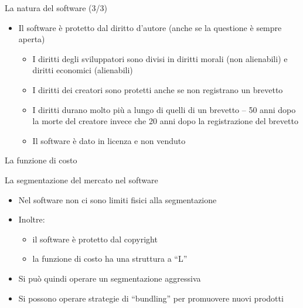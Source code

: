 \documentclass{beamer}
\begin{document}
\begin{frame}
{\centerline{La natura del software (3/3)}}
\begin{itemize}
    \item Il software \`{e} protetto dal diritto d'autore (anche se la questione \`{e} sempre aperta)
\begin{itemize}
    \item I diritti degli sviluppatori sono divisi in diritti morali (non alienabili) e diritti economici (alienabili)
    \item I diritti dei creatori sono protetti anche se non registrano un brevetto 
    \item I diritti durano molto pi\`{u} a lungo di quelli di un brevetto -- 50 anni dopo la morte del creatore invece che 20 anni dopo la registrazione del brevetto 
    \item Il software \`{e} dato in licenza e non venduto
\end{itemize} 
\end{itemize} 

\end{frame}

\begin{frame}
{\centerline{La funzione di costo}}
\begin{center}
    
\end{center}

\end{frame}

\begin{frame}
{\centerline{La segmentazione del mercato nel software}}
\begin{itemize}
\item Nel software non ci sono limiti fisici alla segmentazione
\item Inoltre:
\begin{itemize}
\item il software \`{e} protetto dal copyright
\item la funzione di costo ha una struttura a ``L''
\end{itemize}
\item Si pu\`{o} quindi operare un segmentazione aggressiva
\item Si possono operare strategie di ``bundling'' per promuovere nuovi prodotti
\end{itemize}

\end{frame}
\end{document}
